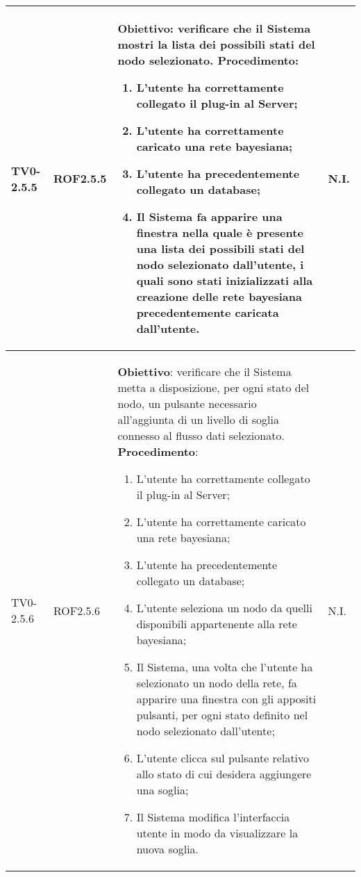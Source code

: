 \begin{longtable}{|C{.15\textwidth}|C{.13\textwidth}|m{.52\textwidth}|C{.08\textwidth}|}
TV0-2.5.5 & ROF2.5.5 &
	\textbf{Obiettivo}: verificare che il Sistema mostri la lista dei possibili stati del nodo selezionato. \newline
	\textbf{Procedimento}:
	\begin{enumerate}
		\item L'utente ha correttamente collegato il plug-in al Server;
		\item L'utente ha correttamente caricato una rete bayesiana;
		\item L'utente ha precedentemente collegato un database;
		\item Il Sistema fa apparire una finestra nella quale è presente   una lista dei possibili stati del nodo selezionato dall'utente, i quali sono stati inizializzati alla creazione delle rete bayesiana precedentemente caricata dall'utente.
	\end{enumerate}
	& N.I. \\
\hline

TV0-2.5.6 & ROF2.5.6 &
	\textbf{Obiettivo}: verificare che il Sistema metta a disposizione, per ogni stato del nodo, un pulsante necessario all'aggiunta di un livello di soglia connesso al flusso dati selezionato. \newline
	\textbf{Procedimento}:
	\begin{enumerate}
		\item L'utente ha correttamente collegato il plug-in al Server;
		\item L'utente ha correttamente caricato una rete bayesiana;
		\item L'utente ha precedentemente collegato un database;
		\item L'utente seleziona un nodo da quelli disponibili appartenente alla rete bayesiana;
		\item Il Sistema, una volta che l'utente ha selezionato un nodo della rete, fa apparire una finestra con gli appositi pulsanti, per ogni stato definito nel nodo selezionato dall'utente;
		\item L'utente clicca sul pulsante relativo allo stato di cui desidera aggiungere una soglia;
		\item Il Sistema modifica l'interfaccia utente in modo da visualizzare la nuova soglia.
	\end{enumerate}
	& N.I. \\
\hline


\end{longtable}
